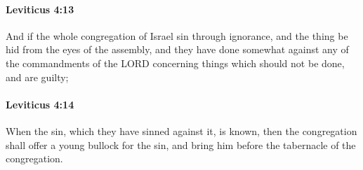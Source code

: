 		\paragraph{Leviticus 4:13} %
			\label{LEVITICUS-4-13}

			And if the whole congregation of Israel sin through ignorance, and the thing be hid from the eyes of the assembly, and they have done somewhat against any of the commandments of the LORD concerning things which should not be done, and are guilty;


		\paragraph{Leviticus 4:14} %
			\label{LEVITICUS-4-14}

			When the sin, which they have sinned against it, is known, then the congregation shall offer a young bullock for the sin, and bring him before the tabernacle of the congregation.


